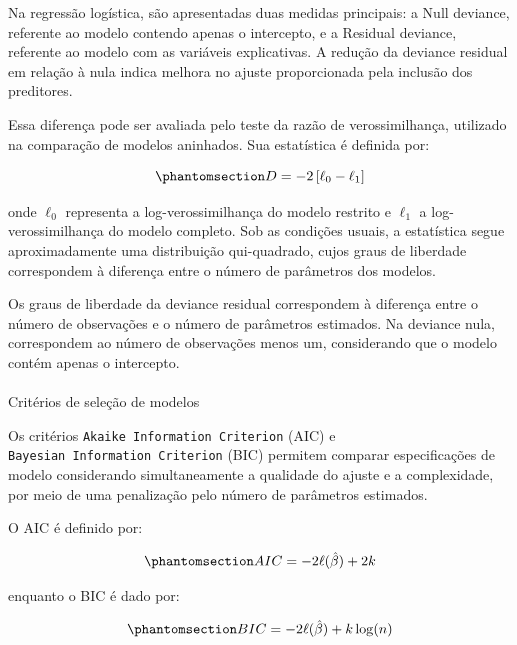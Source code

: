 \documentclass[
  brazilian,
  12pt,
  letterpaper,
  DIV=11,
  numbers=noendperiod]{scrartcl}
\makeatletter
\let\oldparagraph\paragraph
\renewcommand{\paragraph}{
    \@ifstar
      \xxxParagraphStar
      \xxxParagraphNoStar
  }
\newcommand{\xxxParagraphStar}[1]{\oldparagraph*{#1}\mbox{}}
\newcommand{\xxxParagraphNoStar}[1]{\oldparagraph{#1}\mbox{}}
\makeatother
\begin{document}
Na regressão logística, são apresentadas duas medidas principais: a Null
deviance, referente ao modelo contendo apenas o intercepto, e a Residual
deviance, referente ao modelo com as variáveis explicativas. A redução
da deviance residual em relação à nula indica melhora no ajuste
proporcionada pela inclusão dos preditores.

Essa diferença pode ser avaliada pelo teste da razão de verossimilhança,
utilizado na comparação de modelos aninhados. Sua estatística é definida
por:

\begin{equation}\protect\phantomsection\label{eq-lrt}{
D=-2\left[
\ell_0-\ell_1
\right]
}\end{equation}

onde \(\ell_0\) representa a log-verossimilhança do modelo restrito e
\(\ell_1\) a log-verossimilhança do modelo completo. Sob as condições
usuais, a estatística segue aproximadamente uma distribuição
qui-quadrado, cujos graus de liberdade correspondem à diferença entre o
número de parâmetros dos modelos.

Os graus de liberdade da deviance residual correspondem à diferença
entre o número de observações e o número de parâmetros estimados. Na
deviance nula, correspondem ao número de observações menos um,
considerando que o modelo contém apenas o intercepto.

\paragraph{Critérios de seleção de
modelos}\label{crituxe9rios-de-seleuxe7uxe3o-de-modelos}

Os critérios \texttt{Akaike\ Information\ Criterion} (AIC) e
\texttt{Bayesian\ Information\ Criterion} (BIC) permitem comparar
especificações de modelo considerando simultaneamente a qualidade do
ajuste e a complexidade, por meio de uma penalização pelo número de
parâmetros estimados.

O AIC é definido por:

\begin{equation}\protect\phantomsection\label{eq-aic}{
AIC=
-2\ell(\hat{\beta})+2k
}\end{equation}

enquanto o BIC é dado por:

\begin{equation}\protect\phantomsection\label{eq-bic}{
BIC=
-2\ell(\hat{\beta})+k\log(n)
}\end{equation}
\end{document}
